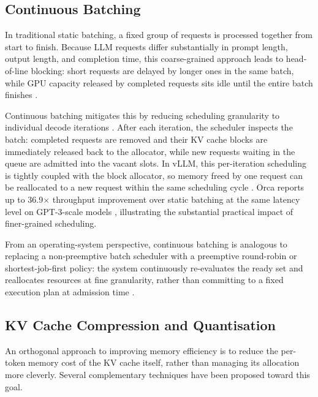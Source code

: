 \documentclass[10pt, a4paper]{article}
\begin{document}

\subsection{Continuous Batching}

In traditional static batching, a fixed group of requests is processed
together from start to finish.
Because LLM requests differ substantially in prompt length, output
length, and completion time, this coarse-grained approach leads to
head-of-line blocking: short requests are delayed by longer ones in
the same batch, while GPU capacity released by completed requests
sits idle until the entire batch finishes \cite{yu2022orca}.

Continuous batching mitigates this by reducing scheduling granularity
to individual decode iterations \cite{yu2022orca}.
After each iteration, the scheduler inspects the batch: completed
requests are removed and their KV cache blocks are immediately released
back to the allocator, while new requests waiting in the queue are
admitted into the vacant slots.
In vLLM, this per-iteration scheduling is tightly coupled with the
block allocator, so memory freed by one request can be reallocated to
a new request within the same scheduling cycle \cite{kwon2023vllm}.
Orca reports up to 36.9$\times$ throughput improvement over static
batching at the same latency level on GPT-3-scale models \cite{yu2022orca},
illustrating the substantial practical impact of finer-grained scheduling.

From an operating-system perspective, continuous batching is analogous
to replacing a non-preemptive batch scheduler with a preemptive
round-robin or shortest-job-first policy: the system continuously
re-evaluates the ready set and reallocates resources at fine
granularity, rather than committing to a fixed execution plan at
admission time \cite{silberschatz2018os}.


\subsection{KV Cache Compression and Quantisation}

An orthogonal approach to improving memory efficiency is to reduce the
per-token memory cost of the KV cache itself, rather than managing its
allocation more cleverly.
Several complementary techniques have been proposed toward this goal.
\end{document}

